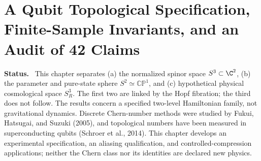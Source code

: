 \documentclass[11pt,a4paper,oneside]{book}
\newcommand{\note}[1]{\par\medskip\noindent\textbf{#1}\ }
\begin{document}
\chapter{A Qubit Topological Specification, Finite-Sample Invariants, and an Audit of 42 Claims}
\note{Status.} This chapter separates (a) the normalized spinor space $S^3\subset\C^2$, (b) the parameter and pure-state sphere $S^2\simeq\mathbb{CP}^1$, and (c) hypothetical physical cosmological space $S_R^3$. The first two are linked by the Hopf fibration; the third does not follow. The results concern a specified two-level Hamiltonian family, not gravitational dynamics. Discrete Chern-number methods were studied by Fukui, Hatsugai, and Suzuki (2005), and topological numbers have been measured in superconducting qubits (Schroer et al., 2014). This chapter develops an experimental specification, an aliasing qualification, and controlled-compression applications; neither the Chern class nor its identities are declared new physics.
\end{document}
